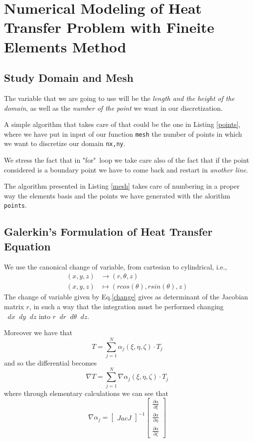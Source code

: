 \documentclass{article}
\newcommand{\diff}{\mathop{}\!d}
\newcommand{\pd}[2]{\frac{\partial #1}{\partial #2}}
\begin{document}
\section{Numerical Modeling of Heat Transfer Problem with Fineite Elements Method}

\subsection{Study Domain and Mesh}
\begin{mdframed}
	The variable that we are going to use will be the \emph{length and the height of the domain}, as well as the \emph{number of the point} we want in our discretization. 
	
	A simple algorithm that takes care of that could be the one in Listing \ref{points}, where we have put in input of our function \texttt{mesh} the number of points in which we want to discretize our domain \texttt{nx,ny}.   
	
	We stress the fact that in "for"~loop we take care also of the fact that if the point considered is a boundary point we have to come back and restart in \emph{another line}.
	
	The algorithm presented in Listing \ref{mesh} takes care of numbering in a proper way the elements basis and the points we have generated with the alorithm \texttt{points}.
	
\end{mdframed}
\subsection{Galerkin’s Formulation of Heat Transfer Equation}

We use the canonical change of variable, from cartesian to cylindrical, i.e., \begin{align}\label{change}
(x,y,z)&\to(r,\theta,z)\\
(x,y,z)&\mapsto(rcos(\theta),rsin(\theta),z)\nonumber
\end{align}
The change of variable given by Eq.\ref{change} gives as determinant of the Jacobian matrix $ r $, in such a way that the integration must be performed changing $ \diff x\diff y\diff z $ into $ r\diff r\diff\theta\diff z $.

Moreover we have that 
\[T=\sum_{j=1}^N\alpha_j(\xi,\eta,\zeta)\cdot T_j \]
and so the differential becomes
\[\nabla T=\sum_{j=1}^N\nabla\alpha_j(\xi,\eta,\zeta)\cdot T_j \]
where through elementary calculations we can see that 
\[\nabla \alpha_j=\begin{bmatrix} Jac J \end{bmatrix}^{-1}\begin{bmatrix}
\pd{\alpha}{\xi}\\\pd{\alpha}{\eta}\\\pd{\alpha}{\zeta} 
\end{bmatrix} \]
\pagebreak
\end{document}
